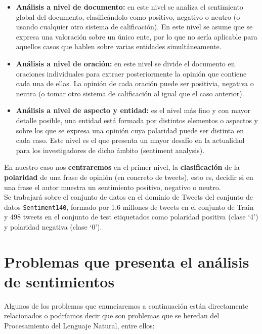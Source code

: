 \documentclass[a4paper,12pt]{report}
\begin{document}
\begin{itemize}
\item \textbf{Análisis a nivel de documento:} en este nivel se analiza el sentimiento global del documento, clasificándolo como positivo, negativo o neutro (o usando cualquier otro sistema de calificación). En este nivel se asume que se expresa una valoración sobre un único ente, por lo que no sería aplicable para aquellos casos que hablen sobre varias entidades simultáneamente.  

\item \textbf{Análisis a nivel de oración:} en este nivel se divide el documento en oraciones individuales para extraer posteriormente la opinión que contiene cada una de ellas. La opinión de cada oración puede ser positivia, negativa o neutra (o tomar otro sistema de calificación al igual que el caso anterior). 

\item \textbf{Análisis a nivel de aspecto y entidad:} es el nivel más fino y con mayor detalle posible, una entidad está formada por distintos elementos o aspectos y sobre los que se expresa una opinión cuya polaridad puede ser distinta en cada caso. Este nivel es el que presenta un mayor desafío en la actualidad para los investigadores de dicho ámbito (sentiment analysis). 

\end{itemize}
\vspace{2mm}

{\setlength{\parindent}{0cm}
En nuestro caso nos \textbf{centraremos} en el primer nivel,  la \textbf{clasificación} de la \textbf{polaridad} de una frase de opinión (en concreto de tweets), esto es, decidir si en una frase el autor muestra un sentimiento positivo, negativo o neutro.}
\vspace{2mm}\\
Se trabajará sobre el
conjunto de datos en el dominio de Tweets del conjunto de datos \texttt{Sentiment140}, formado por
1.6 millones de tweets en el conjunto de Train y 498 tweets en el conjunto de test etiquetados
como polaridad positiva (clase ‘4’) y polaridad negativa (clase ‘0’). 
\vspace{8mm}


\section{Problemas que presenta el análisis de sentimientos}

Algunos de los problemas que enunciaremos a continuación están directamente relacionados o podríamos decir que son problemas que se heredan del Procesamiento del Lenguaje Natural, entre ellos:
\end{document}
